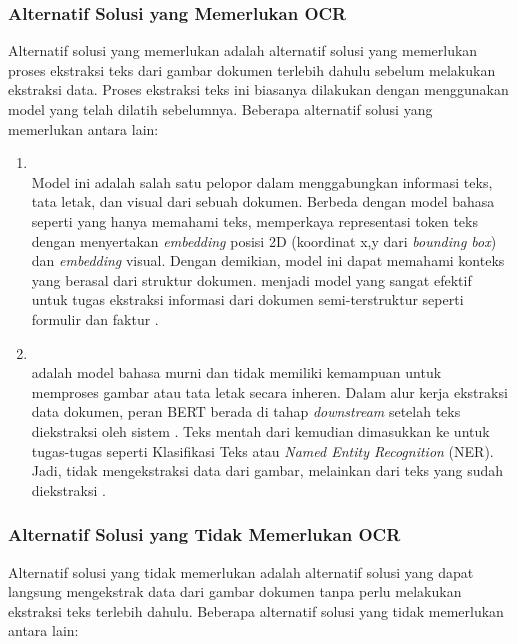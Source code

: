\subsubsection{Alternatif Solusi yang Memerlukan OCR}
\label{subsubsec:alternatif-solusi-memerlukan-ocr}
Alternatif solusi yang memerlukan \ocr{} adalah alternatif solusi yang memerlukan proses ekstraksi teks dari gambar dokumen terlebih dahulu sebelum melakukan ekstraksi data. Proses ekstraksi teks ini biasanya dilakukan dengan menggunakan model \ocr{} yang telah dilatih sebelumnya. Beberapa alternatif solusi yang memerlukan \ocr{} antara lain:
\begin{enumerate}
    \item \layoutlm ~\\ Model ini adalah salah satu pelopor dalam menggabungkan informasi teks, tata letak, dan visual dari sebuah dokumen. Berbeda dengan model bahasa seperti \bert{} yang hanya memahami teks, \layoutlm{} memperkaya representasi token teks dengan menyertakan \textit{embedding} posisi 2D (koordinat x,y dari \emph{bounding box}) dan \textit{embedding} visual. Dengan demikian, model ini dapat memahami konteks yang berasal dari struktur dokumen. \layoutlm{} menjadi model yang sangat efektif untuk tugas ekstraksi informasi dari dokumen semi-terstruktur seperti formulir dan faktur \parencite{xu2020layoutlm}. 
    \item \bert{} ~\\
    \bert{} adalah model bahasa murni dan tidak memiliki kemampuan untuk memproses gambar atau tata letak secara inheren. Dalam alur kerja ekstraksi data dokumen, peran BERT berada di tahap \textit{downstream} setelah teks diekstraksi oleh sistem \ocr. Teks mentah dari \ocr{} kemudian dimasukkan ke \bert{} untuk tugas-tugas \nlp{} seperti Klasifikasi Teks atau \emph{Named Entity Recognition} (NER). Jadi, \bert{} tidak mengekstraksi data dari gambar, melainkan dari teks yang sudah diekstraksi \parencite{koroteev2021bert}. 
\end{enumerate}

\subsubsection{Alternatif Solusi yang Tidak Memerlukan OCR}
\label{subsubsec:alternatif-solusi-tidak-memerlukan-ocr}
Alternatif solusi yang tidak memerlukan \ocr{} adalah alternatif solusi yang dapat langsung mengekstrak data dari gambar dokumen tanpa perlu melakukan ekstraksi teks terlebih dahulu. Beberapa alternatif solusi yang tidak memerlukan \ocr{} antara lain:

